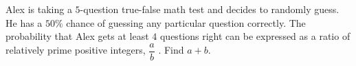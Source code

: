 Alex is taking a $5$-question true-false math test and decides to randomly guess. He has a $50\%$ chance of guessing any particular question correctly. The probability that Alex gets at least $4$ questions right can be expressed as a ratio of relatively prime positive integers, $\dfrac{a}{b}$ . Find $a + b$.
